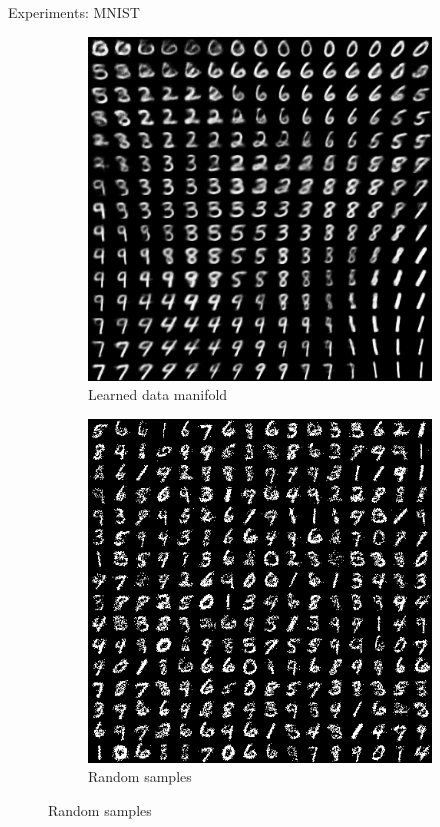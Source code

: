 \documentclass[unicode,11pt]{beamer}
\begin{document}
\begin{frame}{Experiments: MNIST}
  \begin{figure}
    \centering
    \begin{subfigure}[b]{.4\linewidth}
      \centering
      \includegraphics[width=.8\linewidth]{images/vae_mnist_B200_E1000_N784_L2_H400_D_manifold_16}
      \caption{Learned data manifold}
    \end{subfigure}
    \hspace{1em}
    \begin{subfigure}[b]{.4\linewidth}
      \centering
      \includegraphics[width=.8\linewidth]{images/vae_mnist_B200_E1000_N784_L2_H400_D_sample_256}
      \caption{Random samples}
    \end{subfigure}
  \end{figure}
\end{frame}
\end{document}
